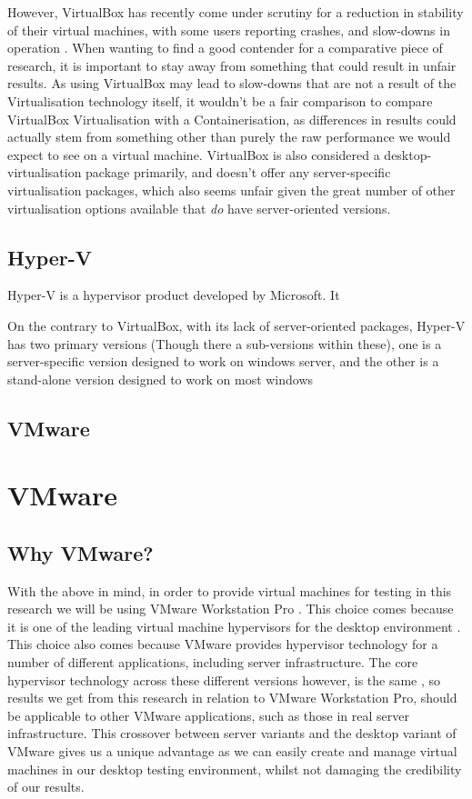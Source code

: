However, VirtualBox has recently come under scrutiny for a reduction in stability of their virtual machines, with some users reporting crashes, and slow-downs in operation \citep{bradford_2020}. When wanting to find a good contender for a comparative piece of research, it is important to stay away from something that could result in unfair results. As using VirtualBox may lead to slow-downs that are not a result of the Virtualisation technology itself, it wouldn't be a fair comparison to compare VirtualBox Virtualisation with a Containerisation, as differences in results could actually stem from something other than purely the raw performance we would expect to see on a virtual machine. VirtualBox is also considered a desktop-virtualisation package primarily, and doesn't offer any server-specific virtualisation packages, which also seems unfair given the great number of other virtualisation options available that \emph{do} have server-oriented versions.

\subsection{Hyper-V}
Hyper-V is a hypervisor product developed by Microsoft. It %

On the contrary to VirtualBox, with its lack of server-oriented packages, Hyper-V has two primary versions (Though there a sub-versions within these), one is a server-specific version designed to work on windows server, and the other is a stand-alone version designed to work on most windows %


\subsection{VMware}

\section{VMware}
\subsection{Why VMware?}
With the above in mind, in order to provide virtual machines for testing in this research we will be using VMware Workstation Pro \citep{VMwareWorkstationPro}. This choice comes because it is one of the leading virtual machine hypervisors for the desktop environment \citep{BestVirtualisationSoftware}. This choice also comes because VMware provides hypervisor technology for a number of different applications, including server infrastructure. The core hypervisor technology across these different versions however, is the same \citep{VMwareProductGuide}, so results we get from this research in relation to VMware Workstation Pro, should be applicable to other VMware applications, such as those in real server infrastructure. This crossover between server variants and the desktop variant of VMware gives us a unique advantage as we can easily create and manage virtual machines in our desktop testing environment, whilst not damaging the credibility of our results.

